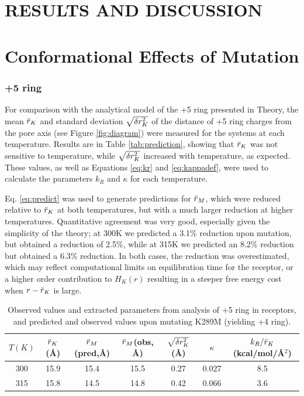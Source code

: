 \documentclass[12pt,onecolumn]{biophys}
\begin{document}
\section*{RESULTS AND DISCUSSION}
\section*{Conformational Effects of Mutation}
\subsubsection*{+5 ring}

For comparison with the analytical model of the +5 ring presented in Theory,  the mean $\bar{r}_{K}$ and standard deviation  $ \sqrt{\delta r^{2}_{K}} $ of the distance of +5 ring charges from the pore axis (see Figure \ref{fig:diagram})  were measured for the \WT systems at each temperature.  Results are in Table \ref{tab:prediction}, showing that $\bar{r}_{K}$ was not sensitive to temperature, while $\sqrt{\delta r^{2}_{K}}$ increased with temperature, as expected.  These values, as well as Equations \ref{eq:kr} and \ref{eq:kappadef}, were used to calculate the parameters $k_{R}$ and $\kappa$ for each temperature.  

Eq. \ref{eq:predict} was used to generate predictions for $\bar{r}_{M}$, which were reduced relative to $\bar{r}_{K}$ at both temperatures, but with a much larger reduction at higher temperatures.  Quantitative agreement was very good, especially given the simplicity of the theory; at 300K we predicted a 3.1\% reduction upon mutation, but obtained a reduction of 2.5\%, while at 315K we predicted an 8.2\% reduction but obtained a 6.3\% reduction.  In both cases, the reduction was overestimated, which may reflect computational limits on equilibration time for the \MT receptor, or a higher order contribution to $H_{K}(r)$ resulting in a steeper free energy cost when $r-\bar{r}_{K}$ is large.     

\begin{table}[htp]
\caption{\label{tab:prediction} Observed values and extracted parameters from analysis of +5 ring in \WT receptors, and predicted and observed values upon mutating K289M (yielding +4 ring).}
\begin{center}
\begin{tabular}{|c|c|c|c|c|c|c|}
$T (K) $& $\bar{r}_{K} $(\AA) &$\bar{r}_{M}$(pred,\AA)&  $\bar{r}_{M}$(obs, \AA)& $ \sqrt{\delta r^{2}_{K}} $ (\AA)& $\kappa$ & $k_{R}/\bar{r}_{K}$ (kcal/mol/\AA$^{2}$)\\
\hline
300 & 15.9 & 15.4 &  15.5 & 0.27 &  0.027&8.5 \\
315 & 15.8 &   14.5&  14.8& 0.42 &  0.066 &3.6
\end{tabular}
\end{center}
\label{default}
\end{table}%
\end{document}
